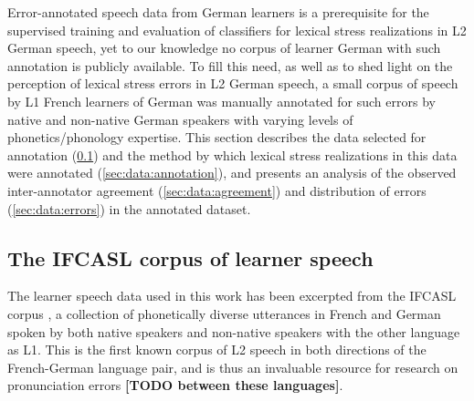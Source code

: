 \documentclass[a4paper]{article}
\newcommand{\TODO}[1]{{\color{red}\textbf{[TODO #1]}}}
\begin{document}
	Error-annotated speech data from German learners is a prerequisite for the supervised training and evaluation of classifiers for  lexical stress realizations in L2 German speech, yet to our knowledge no corpus of learner German with such annotation is publicly available. To fill this need, as well as to shed light on the perception of lexical stress errors in L2 German speech, a small corpus of speech by L1 French learners of German was manually annotated for such errors by native and non-native German speakers with varying levels of phonetics/phonology expertise. This section describes the data selected for annotation (\cref{sec:data:corpus}) and the method by which lexical stress realizations in this data were annotated (\cref{sec:data:annotation}), and presents an analysis of the observed inter-annotator agreement (\cref{sec:data:agreement}) and distribution of errors (\cref{sec:data:errors}) in the annotated dataset.
	
		\subsection{The IFCASL corpus of learner speech}
		\label{sec:data:corpus}		
		
		The learner speech data used in this work has been excerpted from the IFCASL corpus 
		\cite{Fauth2014}, a collection of 
	phonetically diverse utterances in French and German spoken by both native speakers and non-native speakers with the other language as L1. This is the first known corpus of L2 speech in both directions of the French-German language pair, 
	and is thus an invaluable resource for research on pronunciation errors \TODO{between these languages}.
	
\end{document}
